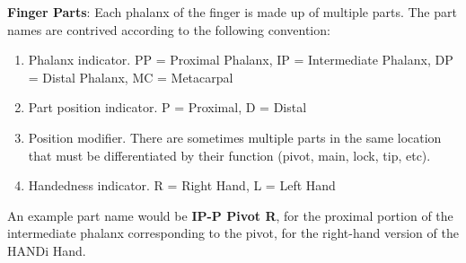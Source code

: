 \documentclass[
11pt, %
oneside, %
english, %
headsepline, %
chapterinoneline, %
openany, %
]{Manual} %
\begin{document}
\noindent\textbf{Finger Parts}: Each phalanx of the finger is made up of multiple parts. The part names are contrived according to the following convention:
\begin{enumerate}
\item Phalanx indicator. PP = Proximal Phalanx, IP = Intermediate Phalanx, DP = Distal Phalanx, MC = Metacarpal
\item Part position indicator. P = Proximal, D = Distal
\item Position modifier. There are sometimes multiple parts in the same location that must be differentiated by their function (pivot, main, lock, tip, etc).
\item Handedness indicator. R = Right Hand, L = Left Hand
\end{enumerate}
An example part name would be \textbf{IP-P Pivot R}, for the proximal portion of the intermediate phalanx corresponding to the pivot, for the right-hand version of the HANDi Hand.
\newpage



\mainmatter %

\pagestyle{thesis} %



%
%
%
%
%
%
%
%
%



\appendix %


%
%
\end{document}
